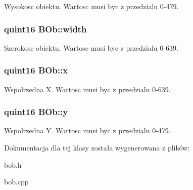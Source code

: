 Wysokosc obiektu. Wartosc musi byc z przedzialu 0-\/479. \hypertarget{class_b_ob_a3e1652784396111952cd16a77a666a2b}{
\subsubsection[{width}]{\setlength{\rightskip}{0pt plus 5cm}quint16 {\bf BOb::width}}}
\label{class_b_ob_a3e1652784396111952cd16a77a666a2b}


Szerokosc obiektu. Wartosc musi byc z przedzialu 0-\/639. \hypertarget{class_b_ob_a5dcc6a3c2f4ffaf3d630187e853dd876}{
\subsubsection[{x}]{\setlength{\rightskip}{0pt plus 5cm}quint16 {\bf BOb::x}}}
\label{class_b_ob_a5dcc6a3c2f4ffaf3d630187e853dd876}


Wspolrzedna X. Wartosc musi byc z przedzialu 0-\/639. \hypertarget{class_b_ob_ada96bf49e446d3f9a5ce02f36e44c9b4}{
\subsubsection[{y}]{\setlength{\rightskip}{0pt plus 5cm}quint16 {\bf BOb::y}}}
\label{class_b_ob_ada96bf49e446d3f9a5ce02f36e44c9b4}


Wspolrzedna Y. Wartosc musi byc z przedzialu 0-\/479. 

Dokumentacja dla tej klasy została wygenerowana z plików:\begin{DoxyCompactItemize}
\item 
bob.h\item 
bob.cpp\end{DoxyCompactItemize}
